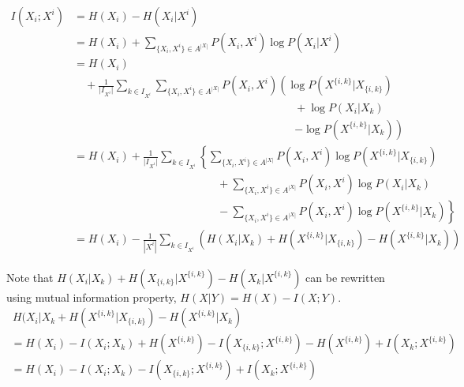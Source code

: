 \begin{align}
 I(X_{ i };X^{ i }) &= H(X_{ i }) - H(X_{ i }|X^{ i }) \nonumber\\
   \qquad &= H(X_{ i }) + \sum_{\{X_{ i },X^{ i }\} \in A^{|X|}} P(X_{ i },X^{ i }) \log P(X_{ i }|X^{ i }) \nonumber\\
   \qquad &= H(X_{ i }) \nonumber\\
   \qquad & \quad + \frac{1}{\vert I_{X^{ i }} \vert} \sum_{k \in I_{X^{ i }}}  \sum_{ \{ X_{ i },X^{ i } \} \in A^{|X|} } P(X_{ i },X^{ i }) \left( \log P(X^{ \{i,k\} }|X_{ \{i,k\} })  \right.  \nonumber\\
	 & \qquad  \qquad  \qquad  \qquad  \qquad  \qquad  \qquad  \qquad  \qquad  \qquad + \log P(X_{ i }|X_{ k })      \nonumber\\
    & \qquad  \qquad  \qquad  \qquad \qquad  \qquad  \qquad  \qquad  \qquad  \qquad \left.	- \log P(X^{ \{i,k\} }|X_{ k })  \right) \nonumber\\				
   \qquad &= H(X_{ i }) + \frac{1}{\vert I_{X^{ i }} \vert} \sum_{k \in I_{X^{ i }}} \left\{ \sum_{ \{ X_{ i },X^{ i } \} \in A^{|X|} }{P(X_{ i },X^{ i })  \log P(X^{ \{i,k\} }|X_{ \{i,k\} })} \right. \nonumber\\ 
   \qquad &\qquad \qquad  \qquad \qquad \qquad \qquad \quad + \sum_{ \{ X_{ i },X^{ i } \} \in A^{|X|} }{P(X_{ i },X^{ i }) \log P(X_{ i }|X_{ k })} \nonumber\\
   \qquad & \left.  \qquad \qquad \qquad \qquad \qquad \qquad \quad - \sum_{ \{ X_{ i },X^{ i } \} \in A^{|X|} }{P(X_{ i },X^{ i }) \log P(X^{ \{i,k\} }|X_{ k })} \right\}  \nonumber\\
   \qquad &= H(X_{ i }) - \frac{1}{|X^{ i }|} \sum_{k \in I_{X^{ i }}}{\left(H(X_{ i }| X_{ k }) + H(X^{ \{i,k\} }|X_{ \{i,k\} }) - H(X^{ \{i,k\} }|X_{ k })  \right)} 
\label{eq_mutual_info_develop}
\end{align}

Note that $H(X_{ i }| X_{ k }) + H(X_{ \{i,k\} }|X^{ \{i,k\} }) - H(X_{ k }|X^{ \{i,k\} })$ can be rewritten using mutual information property, $H(X|Y) = H(X) - I(X;Y)$.
\begin{multline}\label{eq_mutual_info_subs}
\, H(X_{ i }| X_{ k } + H(X^{ \{i,k\} }|X_{ \{i,k\} }) - H(X^{ \{i,k\} }|X_{ k }) \\
= H(X_{ i }) - I(X_{ i };X_{ k }) + H(X^{ \{i,k\} }) - I(X_{ \{i,k\} };X^{ \{i,k\} }) - H(X^{ \{i,k\} }) + I(X_{ k };X^{ \{i,k\} }) \\%
= H(X_{ i }) - I(X_{ i };X_{ k }) - I(X_{ \{i,k\} };X^{ \{i,k\} }) + I(X_{ k };X^{ \{i,k\} })
\end{multline}

